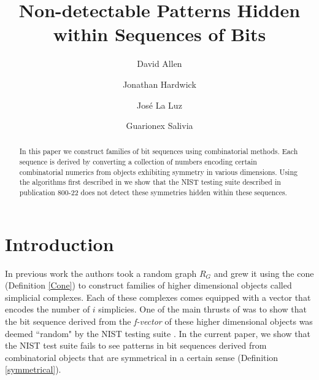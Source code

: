 \documentclass[oneside,12pt]{amsart}
\theoremstyle{definition}
\numberwithin{equation}{section}
\begin{document}
\title{Non-detectable Patterns Hidden within Sequences of Bits}

\author[D. Allen]{David Allen}
\address{Department of Mathematics BMCC, CUNY, New York, New York 10007}

\author[J. Hardwick]{Jonathan Hardwick}
\address{Department of Computer Science, Minnesota state University, Mankato,
South Rd and Ellis Ave, Mankato, MN 56001}



\author[J. La Luz]{Jos\'{e} La Luz}
\address{Departmento de Matem\'aticas, Universidad de Puerto Rico,
Industrial Minillas 170 Car 174, Bayam\'on, PR, 00959-1919}

\author[G. Salivia]{Guarionex Salivia}
\address{Department of Mathematics, Computer Science and Statistics, Gustavus Adolphus College, 800 West College Avenue
Saint Peter, MN 56082}


\begin{abstract}
In this paper we construct families of bit sequences using combinatorial methods.  Each sequence is derived by converting a collection of numbers encoding certain combinatorial numerics from objects exhibiting symmetry in various dimensions.  Using the algorithms first described in \cite{ALDH} we show that the NIST testing suite described in publication 800-22 does not detect these symmetries hidden within these sequences.

\end{abstract}

\maketitle

\section{Introduction}

In previous work \cite{ALDH} the authors took a random graph $R_G$ and grew it using the cone (Definition \ref{Cone}) to construct families of higher dimensional objects called simplicial complexes.  Each of these complexes comes equipped with a vector that encodes the number of $i$ simplicies.  One of the main thrusts of \cite{ALDH} was to show that the bit sequence derived from the \textit{f-vector} of these higher dimensional objects was deemed ``random" by the NIST testing suite \cite{NIST}.  In the current paper, we show that the NIST test suite fails to see patterns in bit sequences derived from combinatorial objects that are symmetrical in a certain sense (Definition \ref{symmetrical}).
\end{document}
